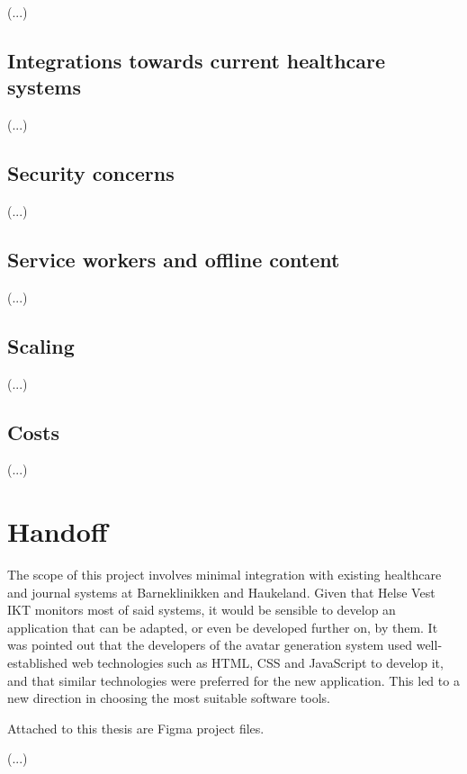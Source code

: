 (...)

\subsection{Integrations towards current healthcare systems}

(...)

\subsection{Security concerns}

(...)

\subsection{Service workers and offline content}

(...)


\subsection{Scaling}

(...)

\subsection{Costs}

(...)

\section{Handoff}

The scope of this project involves minimal integration with existing healthcare and journal systems at Barneklinikken and Haukeland. Given that Helse Vest IKT monitors most of said systems, it would be sensible to develop an application that can be adapted, or even be developed further on, by them. It was pointed out that the developers of the avatar generation system used well-established web technologies such as HTML, CSS and JavaScript to develop it, and that similar technologies were preferred for the new application. This led to a new direction in choosing the most suitable software tools.

Attached to this thesis are Figma project files. %

(...)
